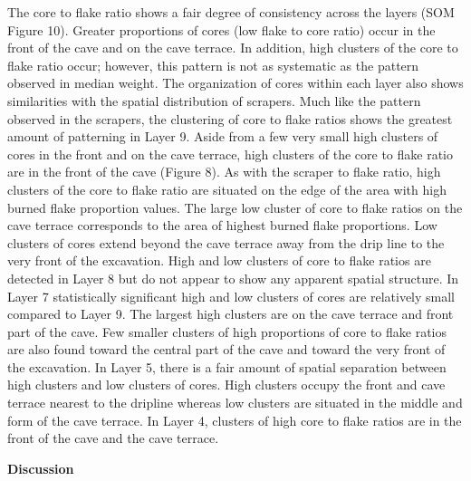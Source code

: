 \documentclass[smallextended]{svjour3}       %
\begin{document}
The core to flake ratio shows a fair degree of consistency across the
layers (SOM Figure 10). Greater proportions of cores (low flake to core
ratio) occur in the front of the cave and on the cave terrace. In
addition, high clusters of the core to flake ratio occur; however, this
pattern is not as systematic as the pattern observed in median weight.
The organization of cores within each layer also shows similarities with
the spatial distribution of scrapers. Much like the pattern observed in
the scrapers, the clustering of core to flake ratios shows the greatest
amount of patterning in Layer 9. Aside from a few very small high
clusters of cores in the front and on the cave terrace, high clusters of
the core to flake ratio are in the front of the cave (Figure 8). As with
the scraper to flake ratio, high clusters of the core to flake ratio are
situated on the edge of the area with high burned flake proportion
values. The large low cluster of core to flake ratios on the cave
terrace corresponds to the area of highest burned flake proportions. Low
clusters of cores extend beyond the cave terrace away from the drip line
to the very front of the excavation. High and low clusters of core to
flake ratios are detected in Layer 8 but do not appear to show any
apparent spatial structure. In Layer 7 statistically significant high
and low clusters of cores are relatively small compared to Layer 9. The
largest high clusters are on the cave terrace and front part of the
cave. Few smaller clusters of high proportions of core to flake ratios
are also found toward the central part of the cave and toward the very
front of the excavation. In Layer 5, there is a fair amount of spatial
separation between high clusters and low clusters of cores. High
clusters occupy the front and cave terrace nearest to the dripline
whereas low clusters are situated in the middle and form of the cave
terrace. In Layer 4, clusters of high core to flake ratios are in the
front of the cave and the cave terrace.

\textbf{Discussion}
\end{document}
